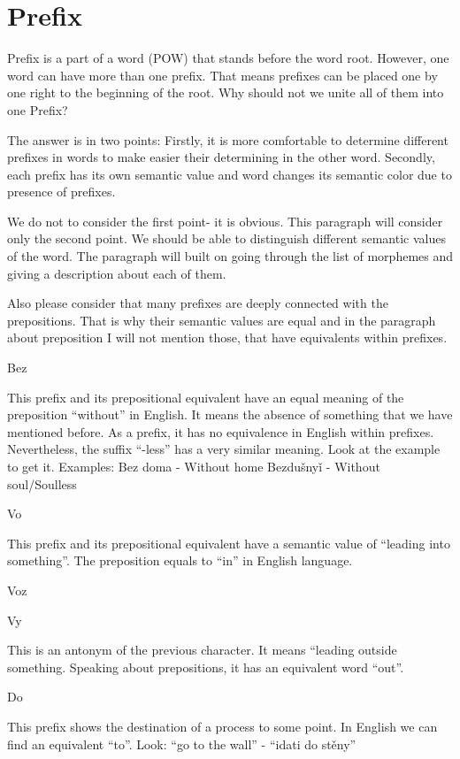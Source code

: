 \section{Prefix}

Prefix is a part of a word (POW) that stands before the word root. However, one word can have more than one prefix. That means prefixes can be placed one by one right to the beginning of the root. Why should not we unite all of them into one Prefix?

The answer is in two points:
Firstly, it is more comfortable to determine different prefixes in words to make easier their determining in the other word.
Secondly, each prefix has its own semantic value and word changes its semantic color due to presence of prefixes.

We do not to consider the first point- it is obvious. This paragraph will consider only the second point. We should be able to distinguish different semantic values of the word. The paragraph will built on going through the list of morphemes and giving a description about each of them.

Also please consider that many prefixes are deeply connected with the prepositions. That is why their semantic values are equal and in the paragraph about preposition I will not mention those, that have equivalents within prefixes.

Bez

This prefix and its prepositional equivalent have an equal meaning of the preposition “without” in English. It means the absence of something that we have mentioned before. As a prefix, it has no equivalence in English within prefixes. Nevertheless, the suffix “-less” has a very similar meaning. Look at the example to get it.
Examples:
Bez doma - Without home
Bezdušnyǐ - Without soul/Soulless 

Vo

This prefix and its prepositional equivalent have a semantic value of “leading into something”. The preposition equals to “in” in English language.

Voz


Vy

This is an antonym of the previous character. It means “leading outside something. Speaking about prepositions, it has an equivalent word “out”.

Do

This prefix shows the destination of a process to some point. In English we can find an equivalent “to”. Look: “go to the wall” - “idati do stěny”

